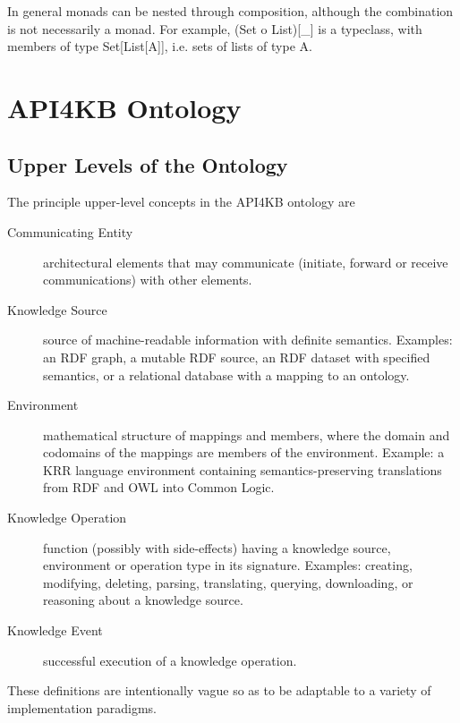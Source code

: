 \documentclass[runningheads]{llncs}
\begin{document}
In general monads can be nested through composition, although the combination is not necessarily a monad. For example, (Set o List)[\_] is a typeclass, with members of type Set[List[A]], i.e. sets of lists of type A.











\section{API4KB Ontology}
\label{sec:ontology}
\subsection{Upper Levels of the Ontology}
\label{sec:upper}
The principle upper-level concepts in the API4KB ontology are
\begin{description}
\item[Communicating Entity] architectural elements that may communicate (initiate, forward or receive communications) with other elements.
\item[Knowledge Source] source of machine-readable information with definite semantics. Examples: an RDF graph, a mutable RDF source, an RDF dataset with specified semantics, or a relational database with a mapping to an ontology.
\item[Environment] mathematical structure of mappings and members, where the domain and codomains of the mappings are members of the environment.  Example: a KRR language environment containing semantics-preserving translations from RDF and OWL into Common Logic.
\item[Knowledge Operation] function (possibly with side-effects) having a knowledge source, environment or operation type in its signature. Examples: creating, modifying, deleting, parsing, translating, querying, downloading, or reasoning about a knowledge source.
\item[Knowledge Event] successful execution of a knowledge operation.
\end{description}
These definitions are intentionally vague so as to be adaptable to a variety of implementation paradigms.
\end{document}
